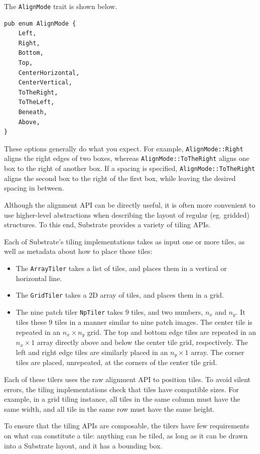 The \verb|AlignMode| trait is shown below.

\begin{verbatim}
pub enum AlignMode {
    Left,
    Right,
    Bottom,
    Top,
    CenterHorizontal,
    CenterVertical,
    ToTheRight,
    ToTheLeft,
    Beneath,
    Above,
}
\end{verbatim}

These options generally do what you expect. For example, \verb|AlignMode::Right| aligns the right edges of two boxes,
whereas \verb|AlignMode::ToTheRight| aligns one box to the right of another box.
If a spacing is specified, \verb|AlignMode::ToTheRight| aligns the second box to the right of the first box,
while leaving the desired spacing in between.

Although the alignment API can be directly useful,
it is often more convenient to use higher-level abstractions
when describing the layout of regular (eg. gridded) structures.
To this end, Substrate provides a variety of tiling APIs.

Each of Substrate's tiling implementations takes as input one or more tiles,
as well as metadata about how to place those tiles:
\begin{itemize}
\item The \verb|ArrayTiler| takes a list of tiles, and places them in a vertical or horizontal line.
\item The \verb|GridTiler| takes a 2D array of tiles, and places them in a grid.
\item The nine patch tiler \verb|NpTiler| takes 9 tiles, and two numbers, $n_x$ and $n_y$.
  It tiles these 9 tiles in a manner similar to nine patch images.
  The center tile is repeated in an $n_x \times n_y$ grid.
  The top and bottom edge tiles are repeated in an $n_x \times 1$ array
  directly above and below the center tile grid, respectively.
  The left and right edge tiles are similarly placed in an $n_y \times 1$ array.
  The corner tiles are placed, unrepeated, at the corners of the center tile grid.
\end{itemize}

Each of these tilers uses the raw alignment API to position tiles.
To avoid silent errors, the tiling implementations check that tiles have compatible sizes.
For example, in a grid tiling instance, all tiles in the same column must have the same width,
and all tile in the same row must have the same height.

To ensure that the tiling APIs are composable, the tilers have few requirements
on what can constitute a tile: anything can be tiled, as long as it can be drawn
into a Substrate layout, and it has a bounding box.

